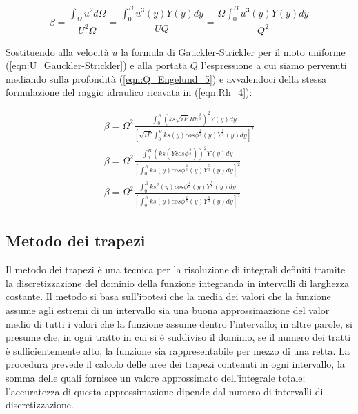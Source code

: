 \documentclass[12pt]{article} %
\begin{document}
\begin{equation}
   \beta=\frac{\int_{\Omega}^{} u^{2}d\Omega}{ U^{2}\Omega}=\frac{\int_{0}^{B} u^{3}(y)Y(y)dy}{UQ}=\frac{\Omega \int_{0}^{B} u^{3}(y)Y(y)dy}{Q^{2}}
   \label{eqn:beta_Engelund_1}
\end{equation}

\noindent Sostituendo alla velocità $u$ la formula di Gauckler-Strickler per il moto uniforme (\ref{eqn:U_Gauckler-Strickler}) e alla portata $Q$ l’espressione a cui siamo pervenuti mediando sulla profondità (\ref{eqn:Q_Engelund_5}) e avvalendoci della stessa formulazione del raggio idraulico ricavata in (\ref{eqn:Rh_4}):

\begin{equation}
    \begin{gathered}
        \beta=\Omega^{2}\frac{\int_{0}^{B}(ks\sqrt{iF}Rh^{\frac{2}{3}})^{2}Y(y)dy}{[\sqrt{iF}\int_{0}^{B} ks(y)cos\phi^{\frac{2}{3}}(y)Y^{\frac{5}{3}}(y)dy]^{2}}
        \\
        \beta=\Omega^{2}\frac{\int_{0}^{B}(ks(Ycos\phi^{\frac{2}{3}}))^{2}Y(y)dy}{[\int_{0}^{B} ks(y)cos\phi^{\frac{2}{3}}(y)Y^{\frac{5}{3}}(y)dy]^{2}}
        \\
        \beta=\Omega^{2}\frac{\int_{0}^{B}ks^{2}(y)cos\phi^{\frac{4}{3}}(y)Y^{\frac{7}{3}}(y)dy}{[\int_{0}^{B} ks(y)cos\phi^{\frac{2}{3}}(y)Y^{\frac{5}{3}}(y)dy]^{2}}
        \end{gathered}
        \label{eqn:beta_Engelund_2}
\end{equation}

\subsection{Metodo dei trapezi}

\noindent Il metodo dei trapezi è una tecnica per la risoluzione di integrali definiti tramite la discretizzazione del dominio della funzione integranda in intervalli di larghezza costante. Il metodo si basa sull’ipotesi che la media dei valori che la funzione assume agli estremi di un intervallo sia una buona approssimazione del valor medio di tutti i valori che la funzione assume dentro l’intervallo; in altre parole, si presume che, in ogni tratto in cui si è suddiviso il dominio, se il numero dei tratti è sufficientemente alto, la funzione sia rappresentabile per mezzo di una retta. La procedura prevede il calcolo delle aree dei trapezi contenuti in ogni intervallo, la somma delle quali fornisce un valore approssimato dell’integrale totale; l'accuratezza di questa approssimazione dipende dal numero di intervalli di discretizzazione.
\end{document}
